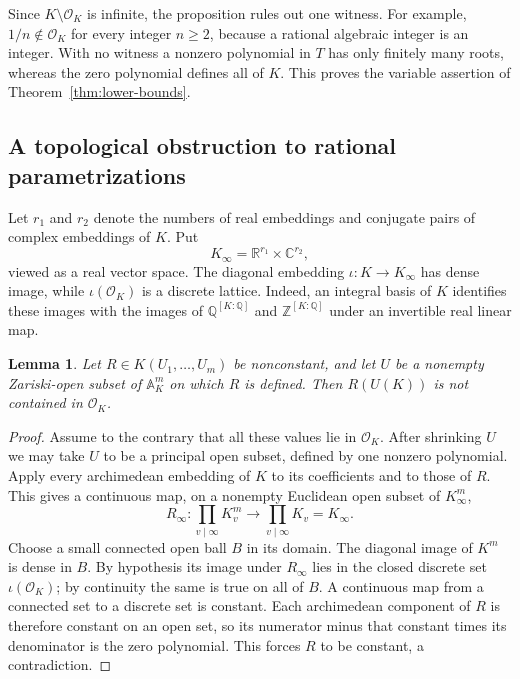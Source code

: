 \documentclass[11pt]{article}
\newtheorem{lemma}[theorem]{Lemma}
\theoremstyle{definition}
\begin{document}
Since $K\setminus\mathcal O_K$ is infinite, the proposition rules out one
witness.  For example, $1/n\notin\mathcal O_K$ for every integer $n\ge2$,
because a rational algebraic integer is an integer.  With no witness a
nonzero polynomial in $T$ has only finitely many roots, whereas the zero
polynomial defines all of $K$.  This proves the variable assertion of
Theorem~\ref{thm:lower-bounds}.

\subsection{A topological obstruction to rational parametrizations}

Let $r_1$ and $r_2$ denote the numbers of real embeddings and conjugate pairs
of complex embeddings of $K$.  Put
\[
 K_{\infty}=\mathbb R^{r_1}\times\mathbb C^{r_2},
\]
viewed as a real vector space.  The diagonal embedding
$\iota:K\longrightarrow K_{\infty}$ has dense image, while
$\iota(\mathcal O_K)$ is a discrete lattice.  Indeed, an integral basis of
$K$ identifies these images with the images of $\mathbb Q^{[K:\mathbb Q]}$
and $\mathbb Z^{[K:\mathbb Q]}$ under an invertible real linear map.

\begin{lemma}\label{lem:rational-function-integral}
Let $R\in K(U_1,\ldots,U_m)$ be nonconstant, and let $U$ be a nonempty
Zariski-open subset of $\mathbb A^m_K$ on which $R$ is defined.
Then $R(U(K))$ is not contained in $\mathcal O_K$.
\end{lemma}
\begin{proof}
Assume to the contrary that all these values lie in $\mathcal O_K$.
After shrinking $U$ we may take $U$ to be a principal open subset, defined by
one nonzero polynomial.  Apply every archimedean embedding of $K$ to its
coefficients and to those of $R$.  This gives a continuous map, on a nonempty
Euclidean open subset of $K_{\infty}^{m}$,
\[
 R_{\infty}:\prod_{v\mid\infty}K_v^m
       \longrightarrow\prod_{v\mid\infty}K_v=K_{\infty}.
\]
Choose a small connected open ball $B$ in its domain.  The diagonal image of
$K^m$ is dense in $B$.  By hypothesis its image under $R_{\infty}$ lies in
the closed discrete set $\iota(\mathcal O_K)$; by continuity the same is true
on all of $B$.  A continuous map from a connected set to a discrete set is
constant.  Each archimedean component of $R$ is therefore constant on an
open set, so its numerator minus that constant times its denominator is the
zero polynomial.  This forces $R$ to be constant, a contradiction.
\end{proof}
\end{document}
